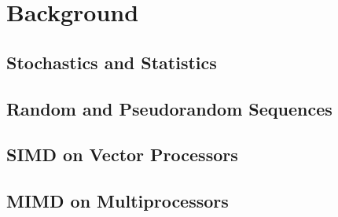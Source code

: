 \documentclass[crop=false]{standalone}
\begin{document}
  \section{Background} %
  \label{sec:background}
    \subsection{Stochastics and Statistics} %
    \label{sub:stochastics_and_statistics}


    \subsection{Random and Pseudorandom Sequences} %
    \label{sub:random_and_pseudorandom_sequences}


    \subsection{SIMD on Vector Processors} %
    \label{sub:vector_processors}


    \subsection{MIMD on Multiprocessors} %
    \label{sub:parallelization}

\end{document}
